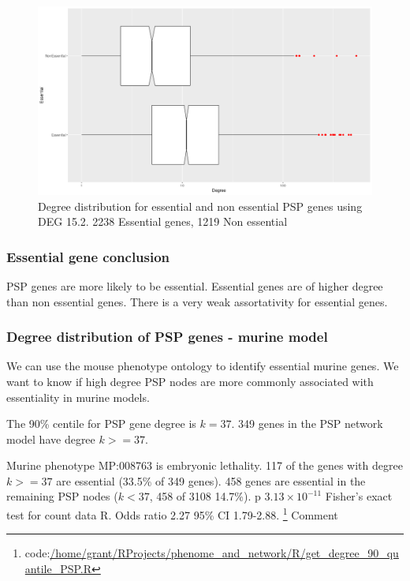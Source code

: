 \begin{figure}
    \centering
    \includegraphics[width=\textwidth]{images/Rplot_essential_non_essential_gene_degree.png}
    \caption{Degree distribution for essential and non essential PSP genes using DEG 15.2. 2238 Essential genes, 1219 Non essential}
    \label{fig:boxplot_log degree essential genes}
\end{figure}



\subsubsection{Essential gene conclusion}
PSP genes are more likely to be essential. Essential genes are of higher degree than non essential genes. There is a very weak assortativity for essential genes. 


 \subsubsection{Degree distribution of PSP genes - murine model}
 
 We can use the mouse phenotype ontology to identify essential murine genes. 
 We want to know if high degree PSP nodes are more commonly associated with essentiality in murine models. 
 
 The 90\% centile for PSP gene degree is $k=37$. 349 genes in the PSP network model have degree $k>=37$.
 
 Murine phenotype MP:008763 is embryonic lethality. 117 of the genes with degree $k>=37$ are essential (33.5\% of 349 genes). 458 genes are essential in the remaining PSP nodes ($k < 37$, 458 of 3108 14.7\%). p $3.13 \times 10^{-11}$ Fisher's exact test for count data R. Odds ratio 2.27 95\% CI 1.79-2.88. \footnote{code:\url{/home/grant/RProjects/phenome_and_network/R/get_degree_90_quantile_PSP.R}}  Comment 
 
